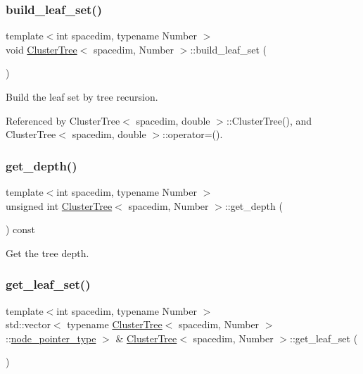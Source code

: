 \subsubsection{\texorpdfstring{build\+\_\+leaf\+\_\+set()}{build\_leaf\_set()}}
{\footnotesize\ttfamily template$<$int spacedim, typename Number $>$ \\
void \hyperlink{classClusterTree}{Cluster\+Tree}$<$ spacedim, Number $>$\+::build\+\_\+leaf\+\_\+set (\begin{DoxyParamCaption}{ }\end{DoxyParamCaption})}

Build the leaf set by tree recursion. 

Referenced by Cluster\+Tree$<$ spacedim, double $>$\+::\+Cluster\+Tree(), and Cluster\+Tree$<$ spacedim, double $>$\+::operator=().

\mbox{\label{classClusterTree_a2bd8dd175c4459338d76a8cb879afccf}} 
\subsubsection{\texorpdfstring{get\+\_\+depth()}{get\_depth()}}
{\footnotesize\ttfamily template$<$int spacedim, typename Number $>$ \\
unsigned int \hyperlink{classClusterTree}{Cluster\+Tree}$<$ spacedim, Number $>$\+::get\+\_\+depth (\begin{DoxyParamCaption}{ }\end{DoxyParamCaption}) const}

Get the tree depth. \mbox{\label{classClusterTree_af17a96da7f2e5391d3e49028b2aba894}} 
\subsubsection{\texorpdfstring{get\+\_\+leaf\+\_\+set()}{get\_leaf\_set()}\hspace{0.1cm}{\footnotesize\ttfamily [1/2]}}
{\footnotesize\ttfamily template$<$int spacedim, typename Number $>$ \\
std\+::vector$<$ typename \hyperlink{classClusterTree}{Cluster\+Tree}$<$ spacedim, Number $>$\+::\hyperlink{classClusterTree_ae4bb0fdc7ac559d7844d04a00ab3e9de}{node\+\_\+pointer\+\_\+type} $>$ \& \hyperlink{classClusterTree}{Cluster\+Tree}$<$ spacedim, Number $>$\+::get\+\_\+leaf\+\_\+set (\begin{DoxyParamCaption}{ }\end{DoxyParamCaption})}

